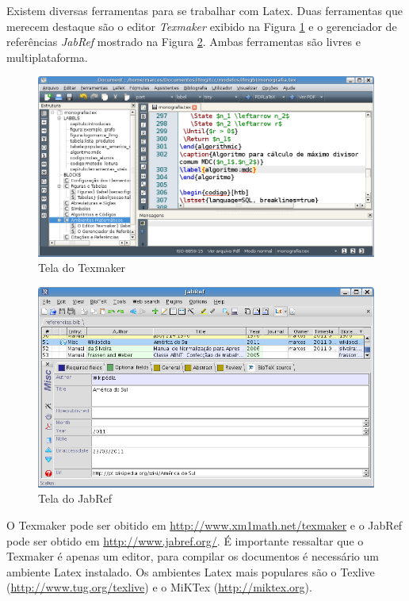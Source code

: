 Existem diversas ferramentas para se trabalhar com Latex. Duas ferramentas que merecem destaque são o editor \textit{Texmaker} exibido na Figura \ref{figura:texmaker} e o gerenciador de referências \textit{JabRef} mostrado na Figura \ref{figura:jabref}. Ambas ferramentas são livres e multiplataforma.

\begin{figure}[htb]
 \centering
 \includegraphics[width=\textwidth]{figuras/texmaker}
 \caption{Tela do Texmaker}
 \label{figura:texmaker}
\end{figure}

\begin{figure}[htb]
 \centering
 \includegraphics[width=\textwidth]{figuras/jabref}
 \caption{Tela do JabRef}
 \label{figura:jabref}
\end{figure}

O Texmaker pode ser obitido em \url{http://www.xm1math.net/texmaker} e o JabRef pode ser obtido em \url{http://www.jabref.org/}. É importante ressaltar que o Texmaker é apenas um editor, para compilar os documentos é necessário um ambiente Latex instalado. Os ambientes Latex mais populares são o Texlive (\url{http://www.tug.org/texlive}) e o MiKTex (\url{http://miktex.org}).
